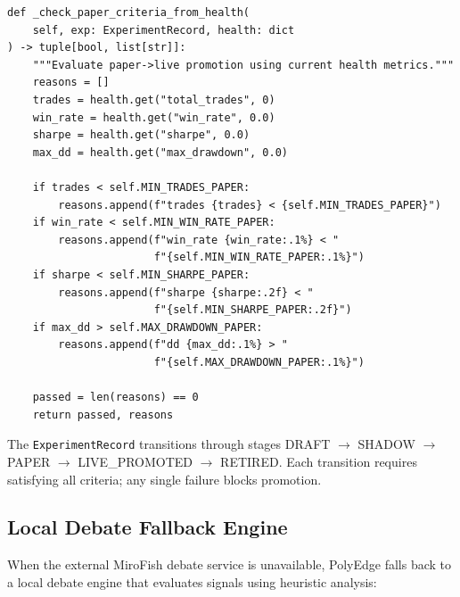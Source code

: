 \documentclass[11pt]{article}
\begin{document}
\begin{lstlisting}[caption={Paper-to-Live promotion criteria (autonomous\_promoter.py, lines 80--110)}]
def _check_paper_criteria_from_health(
    self, exp: ExperimentRecord, health: dict
) -> tuple[bool, list[str]]:
    """Evaluate paper->live promotion using current health metrics."""
    reasons = []
    trades = health.get("total_trades", 0)
    win_rate = health.get("win_rate", 0.0)
    sharpe = health.get("sharpe", 0.0)
    max_dd = health.get("max_drawdown", 0.0)

    if trades < self.MIN_TRADES_PAPER:
        reasons.append(f"trades {trades} < {self.MIN_TRADES_PAPER}")
    if win_rate < self.MIN_WIN_RATE_PAPER:
        reasons.append(f"win_rate {win_rate:.1%} < "
                       f"{self.MIN_WIN_RATE_PAPER:.1%}")
    if sharpe < self.MIN_SHARPE_PAPER:
        reasons.append(f"sharpe {sharpe:.2f} < "
                       f"{self.MIN_SHARPE_PAPER:.2f}")
    if max_dd > self.MAX_DRAWDOWN_PAPER:
        reasons.append(f"dd {max_dd:.1%} > "
                       f"{self.MAX_DRAWDOWN_PAPER:.1%}")

    passed = len(reasons) == 0
    return passed, reasons
\end{lstlisting}

The \texttt{ExperimentRecord} transitions through stages DRAFT $\to$ SHADOW $\to$ PAPER $\to$ LIVE\_PROMOTED $\to$ RETIRED. Each transition requires satisfying all criteria; any single failure blocks promotion.

\subsection{Local Debate Fallback Engine}

When the external MiroFish debate service is unavailable, PolyEdge falls back to a local debate engine that evaluates signals using heuristic analysis:
\end{document}

